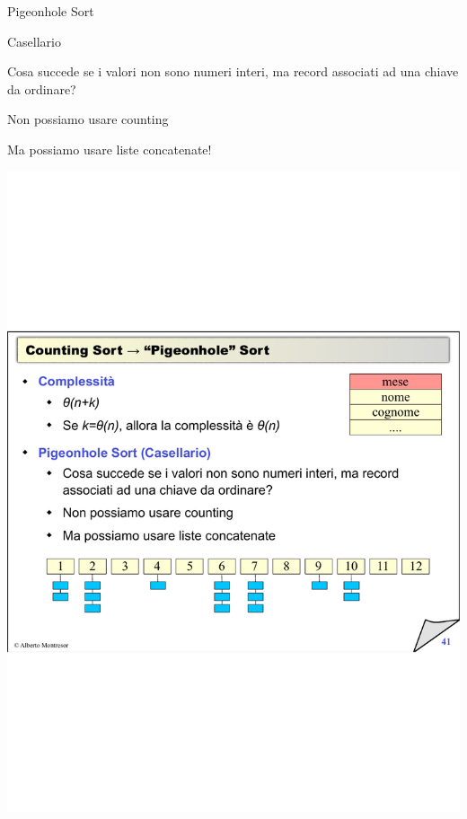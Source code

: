\begin{frame}{Pigeonhole Sort}

\begin{block}{Casellario}
\BI
\item Cosa succede se i valori non sono numeri interi, ma record associati ad una chiave da ordinare?
\item Non possiamo usare counting
\item Ma possiamo usare liste concatenate!
\EI
\end{block}

\bigskip
\includegraphics[width=\textwidth]{pigeonhole.pdf}	

\end{frame}%

